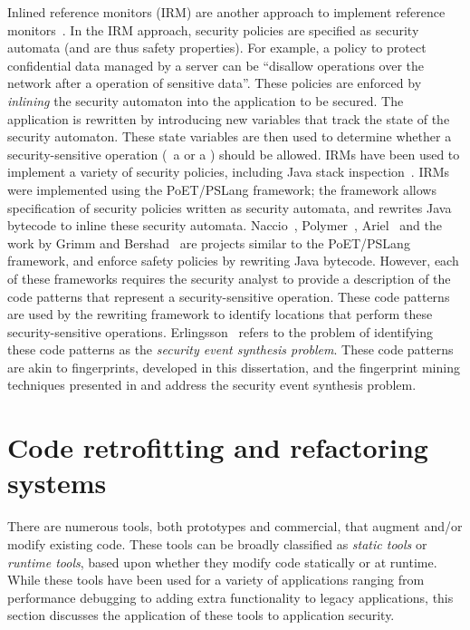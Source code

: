 Inlined reference monitors (IRM) are another approach to implement reference
monitors~\cite{e04}. In the IRM approach, security policies are specified as
security automata (and are thus safety properties). For example, a policy to
protect confidential data managed by a server can be ``disallow 
operations over the network after a  operation of sensitive data''.
These policies are enforced by \textit{inlining} the security automaton into
the application to be secured. The application is rewritten by introducing new
variables that track the state of the security automaton. These state variables
are then used to determine whether a security-sensitive operation (\eg~a
 or a ) should be allowed. IRMs have been used to
implement a variety of security policies, including Java stack
inspection~\cite{es00}. IRMs were implemented using the PoET/PSLang framework;
the framework allows specification of security policies written as security
automata, and rewrites Java bytecode to inline these security automata.
Naccio~\cite{et99}, Polymer~\cite{blw05}, Ariel~\cite{ph99} and the work by Grimm
and Bershad~\cite{gb01} are projects similar to the
PoET/PSLang framework, and enforce safety policies by rewriting Java bytecode.
However, each of these frameworks requires the security analyst to provide a
description of the code patterns that represent a security-sensitive operation.
These code patterns are used by the rewriting framework to identify locations
that perform these security-sensitive operations. Erlingsson~\cite[Pages
73--82]{e04} refers to the problem of identifying these code patterns as the
\textit{security event synthesis problem}. These code patterns are akin to
fingerprints, developed in this dissertation, and the fingerprint mining
techniques presented in  and 
address the security event synthesis problem.

\section{Code retrofitting and refactoring systems}
\label{chapter:relatedwork:coderetrofits}

There are numerous tools, both prototypes and commercial, that augment and/or
modify existing code. These tools can be broadly classified as \textit{static
tools} or \textit{runtime tools}, based upon whether they modify code
statically or at runtime. While these tools have been used for a variety of
applications ranging from performance debugging to adding extra functionality
to legacy applications, this section discusses the application of these tools
to application security.

